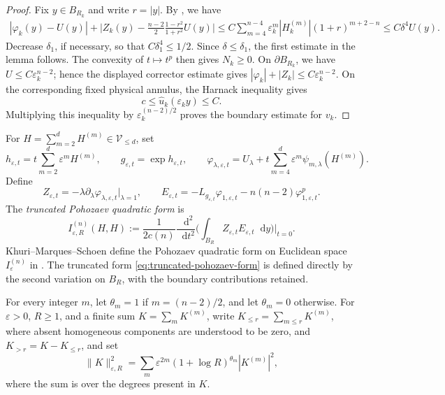 \documentclass[11pt]{article}
\numberwithin{equation}{section}
\theoremstyle{remark}
\newcommand{\dd}{\mathop{}\!\mathrm{d}}
\begin{document}
\begin{proof}
 Fix $y\in B_{R_k}$ and write $r=|y|$. By
\cite[Proposition  4.1 and (4.4)]{KMS}, we have
{
\[
\begin{aligned}
 |\varphi_k(y)-U(y)|
 +\bigg|Z_k(y)-\frac{n-2}{2}\frac{1-r^2}{1+r^2}U(y)\bigg|
 \le{}C\sum_{m=4}^{n-4}\varepsilon_k^m
 |H_k^{(m)}|(1+r)^{m+2-n}
 \le C\delta^4U(y).
\end{aligned}
\]
}
 Decrease $\delta_1$, if necessary, so that
$C\delta_1^4\le1/2$.  Since $\delta\le\delta_1$, the first estimate in the
lemma follows.  The convexity of $t\mapsto t^p$ then gives $N_k\ge0$.
On $\partial B_{R_k}$, we have
$U\le C\varepsilon_k^{n-2}$; hence the displayed corrector estimate
gives $|\varphi_k|+|Z_k|\le C\varepsilon_k^{n-2}$.  On the corresponding
fixed physical annulus, the Harnack inequality gives
{
\[
 c\le\widehat u_k(\varepsilon_k y)\le C.
\]
}
 Multiplying this inequality by $\varepsilon_k^{(n-2)/2}$ proves the
boundary estimate for $v_k$.
\end{proof}


For $H=\sum_{m=2}^dH^{(m)}\in\mathcal V_{\le d}$, set
{
\[
 h_{\varepsilon,t}
 =t\sum_{m=2}^d\varepsilon^mH^{(m)},
 \qquad
 g_{\varepsilon,t}=\exp h_{\varepsilon,t},
 \qquad
 \varphi_{\lambda,\varepsilon,t}
 =U_\lambda+t\sum_{m=4}^d
 \varepsilon^m\psi_{m,\lambda}(H^{(m)}).
\]
}
 Define
{
\[
 Z_{\varepsilon,t}
 =-\lambda\partial_\lambda
 \varphi_{\lambda,\varepsilon,t}\big|_{\lambda=1},
 \qquad
 E_{\varepsilon,t}
 =-L_{g_{\varepsilon,t}}\varphi_{1,\varepsilon,t}
 -n(n-2)\varphi_{1,\varepsilon,t}^p.
\]
}
 The \emph{truncated Pohozaev quadratic form} is
{
\begin{equation}\label{eq:truncated-pohozaev-form}
 I_{\varepsilon,R}^{(n)}(H,H)
 :=\frac{1}{2c(n)}\frac{\dd^2}{\dd t^2}
 \bigg(\int_{B_R}Z_{\varepsilon,t}E_{\varepsilon,t}\dd y\bigg)
 \bigg|_{t=0}.
\end{equation}
}
Khuri--Marques--Schoen define the Pohozaev quadratic form on Euclidean space
$I_\varepsilon^{(n)}$ in \cite[Appendix  A]{KMS}.  The truncated form
\eqref{eq:truncated-pohozaev-form} is defined directly by the second
variation on $B_R$, with the boundary contributions retained.

 For every integer $m$, let $\theta_m=1$ if $m=(n-2)/2$, and let
$\theta_m=0$ otherwise.  For $\varepsilon>0$, $R\ge1$, and a finite
sum $K=\sum_mK^{(m)}$, write
$K_{\le r}=\sum_{m\le r}K^{(m)}$,
 where absent homogeneous components are understood to be zero,
and $K_{>r}=K-K_{\le r}$, and set
{
\begin{equation}\label{eq:weighted-jet-norm}
 \|K\|_{\varepsilon,R}^2
 =\sum_m\varepsilon^{2m}(1+\log R)^{\theta_m}|K^{(m)}|^2,
\end{equation}
}
 where the sum is over the degrees present in $K$.
\end{document}
